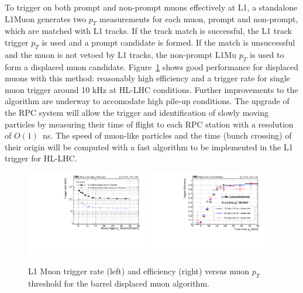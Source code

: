 To trigger on both prompt and non-prompt muons effectively at L1, a standalone L1Muon generates two $p_T$ measurements for each muon, prompt and
non-prompt, which are matched with L1 tracks. 
If the track match is successful, the L1 track trigger $p_T$ is used and a
prompt candidate is formed. 
If the match is unsuccessful and the muon is not vetoed by L1 tracks, the
non-prompt L1Mu $p_T$ is used to form a displaced muon candidate.
Figure~\ref{fig:cmsL1mu} shows good performance for displaced muons with this method: reasonably high efficiency and a
trigger rate for single muon trigger around 10 kHz at HL-LHC conditions. Further improvements to the algorithm are underway to accomodate high pile-up conditions. 
The upgrade of the RPC system will allow the trigger and identification of slowly moving
particles by measuring their time of flight to each RPC station with a resolution of $O(1)$~ns. 
The speed of muon-like particles and the time (bunch crossing) of their
origin will be computed with a fast algorithm to be implemented in the L1 trigger for HL-LHC.

\begin{figure}[h!tbp]
\begin{center}
  \includegraphics[width=0.47\textwidth]{figures/cmsupgrade/TDR-17-003_fig_7_11_a_Prompt_L1Mu_trigger_rate_pt__L1Mu__L1Mu2st__DisplacedL1MuDirectionBased_MB1_MB2_MB3_MB4_combined_eta0to0p9.pdf} \hfill
  \includegraphics[width=0.47\textwidth]{figures/cmsupgrade/TDR-17-003_fig_7_11_b_L1MuonTDR2017Displaced_L1MuPt20_SimMuPt_DT1_DT2_DT3_DT4_combined_eta0to0p9_dxy5to50_looseVeto.pdf}
  \caption{ L1 Muon trigger rate (left) and efficiency (right) versus muon $p_T$ threshold for the barrel displaced muon algorithm. 
 }
  \label{fig:cmsL1mu}
\end{center}
\end{figure}

